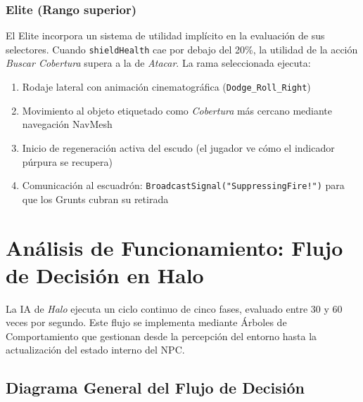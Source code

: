 \documentclass[12pt,letterpaper]{article}
\begin{document}
\subsubsection{Elite (Rango superior)}

El Elite incorpora un sistema de utilidad implícito en la evaluación de sus selectores. Cuando \texttt{shieldHealth} cae por debajo del 20\%, la utilidad de la acción \textit{Buscar Cobertura} supera a la de \textit{Atacar}. La rama seleccionada ejecuta:

\begin{enumerate}[nosep]
  \item Rodaje lateral con animación cinematográfica (\texttt{Dodge\_Roll\_Right})
  \item Movimiento al objeto etiquetado como \textit{Cobertura} más cercano mediante navegación NavMesh
  \item Inicio de regeneración activa del escudo (el jugador ve cómo el indicador púrpura se recupera)
  \item Comunicación al escuadrón: {\small\texttt{BroadcastSignal("Suppressing\-Fire!")}} para que los Grunts cubran su retirada
\end{enumerate}

\section{Análisis de Funcionamiento: Flujo de Decisión en Halo}

La IA de \textit{Halo} ejecuta un ciclo continuo de cinco fases, evaluado entre 30 y 60 veces por segundo. Este flujo se implementa mediante Árboles de Comportamiento que gestionan desde la percepción del entorno hasta la actualización del estado interno del NPC.

\subsection{Diagrama General del Flujo de Decisión}
\end{document}
